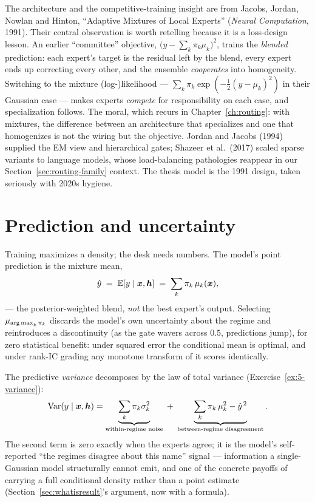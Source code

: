 \begin{origins}
The architecture and the competitive-training insight are from Jacobs,
Jordan, Nowlan and Hinton, ``Adaptive Mixtures of Local Experts''
(\emph{Neural Computation}, 1991). Their central observation is worth
retelling because it is a loss-design lesson. An earlier ``committee''
objective, $\bigl(y - \sum_k \pi_k \mu_k\bigr)^2$, trains the
\emph{blended} prediction: each expert's target is the residual left by
the blend, every expert ends up correcting every other, and the ensemble
\emph{cooperates} into homogeneity. Switching to the mixture
(log-)likelihood --- $\sum_k \pi_k \exp(-\tfrac12(y-\mu_k)^2)$ in their
Gaussian case --- makes experts \emph{compete} for responsibility on each
case, and specialization follows. The moral, which recurs in
Chapter~\ref{ch:routing}: with mixtures, the difference between an
architecture that specializes and one that homogenizes is not the wiring
but the objective. Jordan and Jacobs (1994) supplied the EM view and
hierarchical gates; Shazeer et al.\ (2017) scaled sparse variants to
language models, whose load-balancing pathologies reappear in our
Section~\ref{sec:routing-family} context. The thesis model is the 1991
design, taken seriously with 2020s hygiene.
\end{origins}

\section{Prediction and uncertainty}\label{sec:prediction}

Training maximizes a density; the desk needs numbers. The model's point
prediction is the mixture mean,
\begin{equation}\label{eq:yhat}
  \hat y \;=\; \mathbb{E}[y \mid \bm{x}, \bm{h}]
  \;=\; \sum_k \pi_k\, \mu_k(\bm{x}),
\end{equation}
--- the posterior-weighted blend, \emph{not} the best expert's output.
Selecting $\mu_{\operatorname*{arg\,max}_k \pi_k}$ discards the model's own uncertainty
about the regime and reintroduces a discontinuity (as the gate wavers
across $0.5$, predictions jump), for zero statistical benefit: under
squared error the conditional mean is optimal, and under rank-IC grading
any monotone transform of it scores identically.

The predictive \emph{variance} decomposes by the law of total variance
(Exercise~\ref{ex:5-variance}):
\begin{equation}\label{eq:totalvar}
  \operatorname{Var}(y \mid \bm{x}, \bm{h})
  = \underbrace{\sum_k \pi_k \sigma_k^2}_{\text{within-regime noise}}
  \;+\;
  \underbrace{\sum_k \pi_k\, \mu_k^2 - \hat y^{\,2}}_{
    \text{between-regime disagreement}} .
\end{equation}
The second term is zero exactly when the experts agree; it is the model's
self-reported ``the regimes disagree about this name'' signal ---
information a single-Gaussian model structurally cannot emit, and one of
the concrete payoffs of carrying a full conditional density rather than a
point estimate (Section~\ref{sec:whatisresult}'s argument, now with a
formula).

